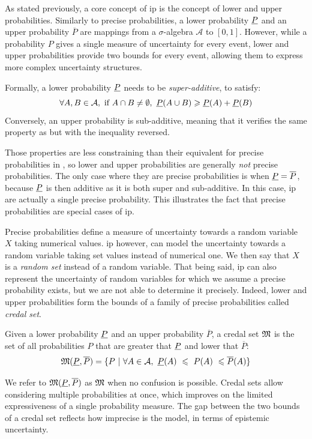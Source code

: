 As stated previously, a core concept of \acrshort{ip} is the concept of lower and upper probabilities. Similarly to precise probabilities, a lower probability $\underline{P}$ and an upper probability $\overline{P}$ are mappings from a $\sigma$-algebra $\mathcal{A}$ to $[0, 1]$. However, while a probability $P$ gives a single measure of uncertainty for every event, lower and upper probabilities provide two bounds for every event, allowing them to express more complex uncertainty structures.

\begin{remark}
    Formally, a lower probability $\underline{P}$ needs to be \textit{super-additive}, \ie to satisfy:
    \begin{equation}
        \forall A,B\in\mathcal{A}, \text{ if } A\cap B\neq\emptyset, ~\underline{P}(A\cup B)\geqslant \underline{P}(A)+\underline{P}(B) \label{eq:super_additivity}
    \end{equation}
    Conversely, an upper probability is sub-additive, meaning that it verifies the same property as  but with the inequality reversed.
    
    Those properties are less constraining than their equivalent for precise probabilities in , so lower and upper probabilities are generally \textit{not} precise probabilities. The only case where they are precise probabilities is when $\underline{P}=\overline{P}$, because $\underline{P}$ is then additive as it is both super and sub-additive. In this case, \acrshort{ip} are actually a single precise probability. This illustrates the fact that precise probabilities are special cases of \acrshort{ip}. 
\end{remark}

Precise probabilities define a measure of uncertainty towards a random variable $X$ taking numerical values. \acrshort{ip} however, can model the uncertainty towards a random variable taking set values instead of numerical one. We then say that $X$ is a \textit{random set} instead of a random variable. That being said, \acrshort{ip} can also represent the uncertainty of random variables for which we assume a precise probability exists, but we are not able to determine it precisely. Indeed, lower and upper probabilities form the bounds of a family of precise probabilities called \textit{credal set}.
\begin{definition}\label{def:credal_set}
    Given a lower probability $\underline{P}$ and an upper probability $\overline{P}$, a credal set $\mathfrak{M}$ is the set of all probabilities $P$ that are greater that $\underline{P}$ and lower that $\overline{P}$:
    \begin{equation}
        \mathfrak{M}(\underline{P}, \overline{P}) = \{P~|~\forall A\in\mathcal{A},~\underline{P}(A)~\leqslant~P(A)~\leqslant\overline{P}(A)\}
    \end{equation}
\end{definition}
We refer to $\mathfrak{M}(\underline{P}, \overline{P})$ as $\mathfrak{M}$ when no confusion is possible. Credal sets allow considering multiple probabilities at once, which improves on the limited expressiveness of a single probability measure. The gap between the two bounds of a credal set reflects how imprecise is the model, in terms of epistemic uncertainty.

